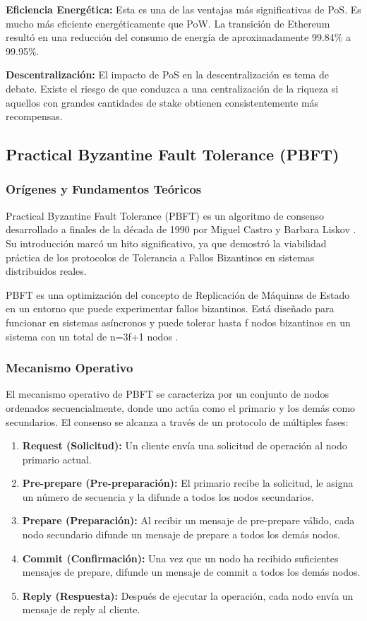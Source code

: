 \documentclass[spanish,12pt,letterpaper]{report}
\begin{document}
\textbf{Eficiencia Energética:} Esta es una de las ventajas más significativas de PoS. Es mucho más eficiente energéticamente que PoW. La transición de Ethereum resultó en una reducción del consumo de energía de aproximadamente 99.84\% a 99.95\%.

\textbf{Descentralización:} El impacto de PoS en la descentralización es tema de debate. Existe el riesgo de que conduzca a una centralización de la riqueza si aquellos con grandes cantidades de stake obtienen consistentemente más recompensas.

\subsection{Practical Byzantine Fault Tolerance (PBFT)}

\subsubsection{Orígenes y Fundamentos Teóricos}

Practical Byzantine Fault Tolerance (PBFT) es un algoritmo de consenso desarrollado a finales de la década de 1990 por Miguel Castro y Barbara Liskov \parencite{castro1999practical}. Su introducción marcó un hito significativo, ya que demostró la viabilidad práctica de los protocolos de Tolerancia a Fallos Bizantinos en sistemas distribuidos reales.

PBFT es una optimización del concepto de Replicación de Máquinas de Estado en un entorno que puede experimentar fallos bizantinos. Está diseñado para funcionar en sistemas asíncronos y puede tolerar hasta f nodos bizantinos en un sistema con un total de n=3f+1 nodos \parencite{geeksforgeeks2024pbft}.

\subsubsection{Mecanismo Operativo}

El mecanismo operativo de PBFT se caracteriza por un conjunto de nodos ordenados secuencialmente, donde uno actúa como el primario y los demás como secundarios. El consenso se alcanza a través de un protocolo de múltiples fases:

\begin{enumerate}
    \item \textbf{Request (Solicitud):} Un cliente envía una solicitud de operación al nodo primario actual.
    \item \textbf{Pre-prepare (Pre-preparación):} El primario recibe la solicitud, le asigna un número de secuencia y la difunde a todos los nodos secundarios.
    \item \textbf{Prepare (Preparación):} Al recibir un mensaje de pre-prepare válido, cada nodo secundario difunde un mensaje de prepare a todos los demás nodos.
    \item \textbf{Commit (Confirmación):} Una vez que un nodo ha recibido suficientes mensajes de prepare, difunde un mensaje de commit a todos los demás nodos.
    \item \textbf{Reply (Respuesta):} Después de ejecutar la operación, cada nodo envía un mensaje de reply al cliente.
\end{enumerate}
\end{document}
